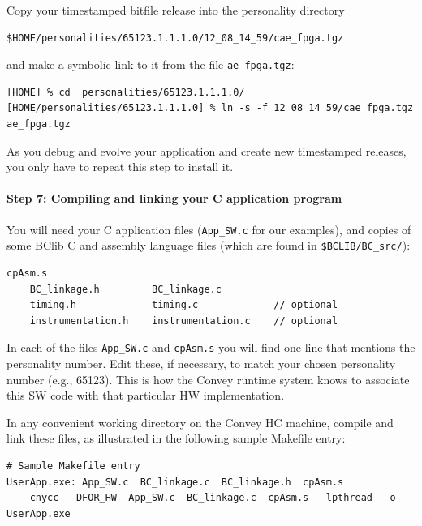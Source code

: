 \documentclass[twoside,letterpaper,11pt]{article}
\newcommand{\hm}{\hspace*{1em}}
\begin{document}
Copy your timestamped bitfile release into the personality directory
\begin{Verbatim}[frame=single, label=Personality bit file location]
    $HOME/personalities/65123.1.1.1.0/12_08_14_59/cae_fpga.tgz
\end{Verbatim}
and make a symbolic link to it from the file \verb|ae_fpga.tgz|:
\begin{Verbatim}[frame=single, label=Installing each timestamped personality bit file]
[HOME] % cd  personalities/65123.1.1.1.0/
[HOME/personalities/65123.1.1.1.0] % ln -s -f 12_08_14_59/cae_fpga.tgz  ae_fpga.tgz
\end{Verbatim}

As you debug and evolve your application and create new timestamped
releases, you only have to repeat this step to install it.


\paragraph{Step 7: Compiling and linking your C application program}
\hm

You will need your C application files (\verb|App_SW.c| for our
examples), and copies of some BClib C and assembly language files
(which are found in \verb|$BCLIB/BC_src/|):

\begin{Verbatim}[frame=single]
    cpAsm.s
    BC_linkage.h         BC_linkage.c
    timing.h             timing.c             // optional
    instrumentation.h    instrumentation.c    // optional
\end{Verbatim}

In each of the files \verb|App_SW.c| and \verb|cpAsm.s| you will find
one line that mentions the personality number.  Edit these, if
necessary, to match your chosen personality number (e.g., 65123). This
is how the Convey runtime system knows to associate this SW code with
that particular HW implementation.

In any convenient working directory on the Convey HC machine, compile
and link these files, as illustrated in the following sample Makefile entry:

\begin{Verbatim}[frame=single, label=Compiling and linking your SW program]
# Sample Makefile entry
UserApp.exe: App_SW.c  BC_linkage.c  BC_linkage.h  cpAsm.s
	cnycc  -DFOR_HW  App_SW.c  BC_linkage.c  cpAsm.s  -lpthread  -o UserApp.exe
\end{Verbatim}
\end{document}
